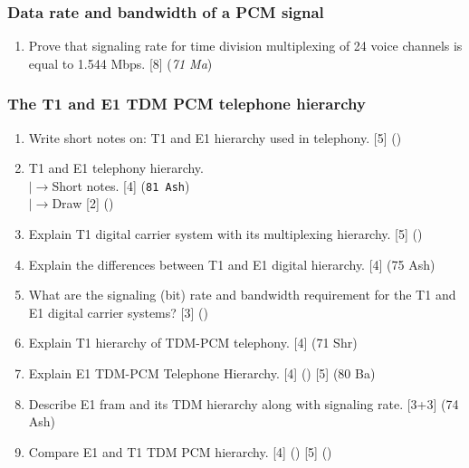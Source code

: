 \documentclass[12pt]{article}
\newcommand{\lb}{\\$\left|\rightarrow\right.$}
\begin{document}
    \subsubsection{Data rate and bandwidth of a PCM signal}
      \begin{enumerate}
        \item Prove that signaling rate for time division multiplexing of 24 voice channels is equal to 1.544 Mbps. \hfill [8] (\textit{71 Ma})
      \end{enumerate}

    \subsubsection{The T1 and E1 TDM PCM telephone hierarchy}
      \begin{enumerate}
        \item Write short notes on: T1 and E1 hierarchy used in telephony. \hfill [5] ()
        
        \item T1 and E1 telephony hierarchy.
          \lb Short notes. \hfill [4] (\texttt{81 Ash})
          \lb Draw \hfill [2] ()
        
        \item Explain T1 digital carrier system with its multiplexing hierarchy. \hfill [5] ()
        
        \item Explain the differences between T1 and E1 digital hierarchy. \hfill [4] (75 Ash)
        
        \item What are the signaling (bit) rate and bandwidth requirement for the T1 and E1 digital carrier systems? \hfill [3] ()
        
        \item Explain T1 hierarchy of TDM-PCM telephony. \hfill [4] (71 Shr)
        
        \item Explain E1 TDM-PCM Telephone Hierarchy. \hfill [4] () [5] (80 Ba)
        
        \item Describe E1 fram and its TDM hierarchy along with signaling rate. \hfill [3+3] (74 Ash)

        \item Compare E1 and T1 TDM PCM hierarchy. \hfill [4] () [5] ()
        

\end{enumerate}
\end{document}
